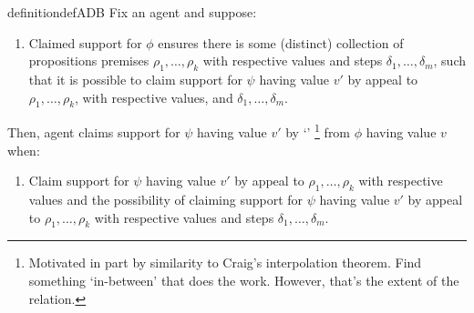\begin{note}

    \begin{restatable}[\adB{}]{definition}{defADB}\label{AR:adB}
    Fix an agent and suppose:
    \begin{enumerate}[label=\textsf{I:\arabic*}., ref=(\textsf{I}:\arabic*), series=adB_counter]
    \item\label{def:adB:poss} Claimed support for \(\phi\) ensures there is some (distinct) collection of propositions premises \(\rho_{1},\dots,\rho_{k}\) with respective values and steps \(\delta_{1},\dots,\delta_{m}\), such that it is possible to claim support for \(\psi\) having value \(v'\) by appeal to \(\rho_{1},\dots,\rho_{k}\), with respective values, and \(\delta_{1},\dots,\delta_{m}\).
    \end{enumerate}
    Then, agent claims support for \(\psi\) having value \(v'\) by `\adB{}'\nolinebreak
    \footnote{
      Motivated in part by similarity to Craig's interpolation theorem.
      Find something `in-between' that does the work.
      However, that's the extent of the relation.
    }
    from \(\phi\) having value \(v\) when:
    \begin{enumerate}[label=\textsf{I}:\arabic*., ref=(\textsf{I}:\arabic*), resume*=adB_counter]
    \item\label{def:adB:inter} Claim support for \(\psi\) having value \(v'\) by appeal to \(\rho_{1},\dots,\rho_{k}\) with respective values and the possibility of claiming support for \(\psi\) having value \(v'\) by appeal to \(\rho_{1},\dots,\rho_{k}\) with respective values and steps \(\delta_{1},\dots,\delta_{m}\).
    \end{enumerate}
    \vspace{-\baselineskip}
  \end{restatable}
\end{note}

